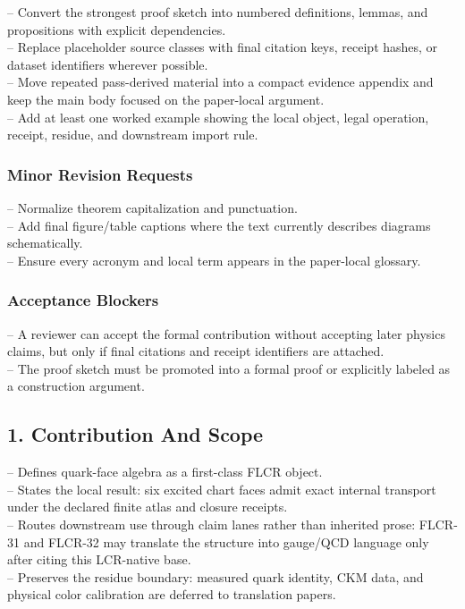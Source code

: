 \documentclass[11pt]{article}
\begin{document}
\noindent{}-- Convert the strongest proof sketch into numbered definitions, lemmas, and propositions with explicit dependencies.\\
\noindent{}-- Replace placeholder source classes with final citation keys, receipt hashes, or dataset identifiers wherever possible.\\
\noindent{}-- Move repeated pass-derived material into a compact evidence appendix and keep the main body focused on the paper-local argument.\\
\noindent{}-- Add at least one worked example showing the local object, legal operation, receipt, residue, and downstream import rule.\\

\subsubsection*{Minor Revision Requests}

\noindent{}-- Normalize theorem capitalization and punctuation.\\
\noindent{}-- Add final figure/table captions where the text currently describes diagrams schematically.\\
\noindent{}-- Ensure every acronym and local term appears in the paper-local glossary.\\

\subsubsection*{Acceptance Blockers}

\noindent{}-- A reviewer can accept the formal contribution without accepting later physics claims, but only if final citations and receipt identifiers are attached.\\
\noindent{}-- The proof sketch must be promoted into a formal proof or explicitly labeled as a construction argument.\\


\subsection*{1. Contribution And Scope}

\noindent{}-- Defines quark-face algebra as a first-class FLCR object.\\
\noindent{}-- States the local result: six excited chart faces admit exact internal transport under the declared finite atlas and closure receipts.\\
\noindent{}-- Routes downstream use through claim lanes rather than inherited prose: FLCR-31 and FLCR-32 may translate the structure into gauge/QCD language only after citing this LCR-native base.\\
\noindent{}-- Preserves the residue boundary: measured quark identity, CKM data, and physical color calibration are deferred to translation papers.\\
\end{document}
